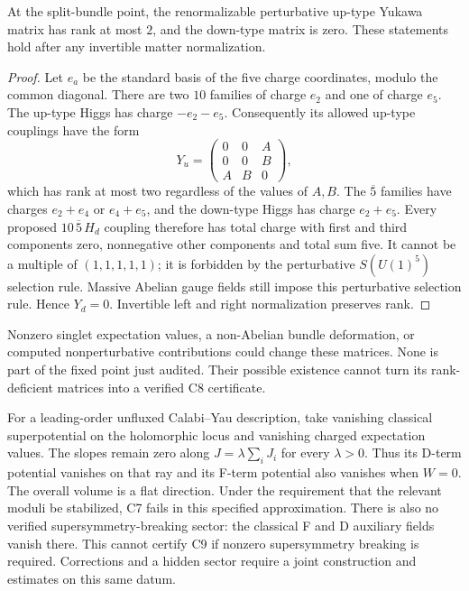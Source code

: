 \begin{proposition}\label{prop:rankfailure}
At the split-bundle point, the renormalizable perturbative up-type
Yukawa matrix has rank at most $2$, and the down-type matrix is zero.
These statements hold after any invertible matter normalization.
\end{proposition}
\begin{proof}
Let $e_a$ be the standard basis of the five charge coordinates, modulo
the common diagonal. There are two $10$ families of charge $e_2$ and
one of charge $e_5$. The up-type Higgs has charge $-e_2-e_5$.
Consequently its allowed up-type couplings have the form
\[
 Y_u=\begin{pmatrix}0&0&A\\0&0&B\\A&B&0\end{pmatrix},
\]
which has rank at most two regardless of the values of $A,B$.
The $\overline5$ families have charges $e_2+e_4$ or $e_4+e_5$,
and the down-type Higgs has charge $e_2+e_5$. Every proposed
$10\,\overline5\,H_d$ coupling therefore has total charge with first
and third components zero, nonnegative other components and total
sum five. It cannot be a multiple of $(1,1,1,1,1)$; it is forbidden
by the perturbative $S(U(1)^5)$ selection rule. Massive Abelian gauge
fields still impose this perturbative selection rule. Hence $Y_d=0$.
Invertible left and right normalization preserves rank.
\end{proof}
Nonzero singlet expectation values, a non-Abelian bundle deformation,
or computed nonperturbative contributions could change these matrices.
None is part of the fixed point just audited. Their possible existence
cannot turn its rank-deficient matrices into a verified C8 certificate.

For a leading-order unfluxed Calabi--Yau description, take vanishing
classical superpotential on the holomorphic locus and vanishing charged
expectation values. The slopes remain zero along
$J=\lambda\sum_iJ_i$ for every $\lambda>0$. Thus its D-term potential
vanishes on that ray and its F-term potential also vanishes when $W=0$.
The overall volume is a flat direction. Under the requirement that the
relevant moduli be stabilized, C7 fails in this specified approximation.
There is also no verified supersymmetry-breaking sector: the classical
F and D auxiliary fields vanish there. This cannot certify C9 if
nonzero supersymmetry breaking is required. Corrections and a hidden
sector require a joint construction and estimates on this same datum.

